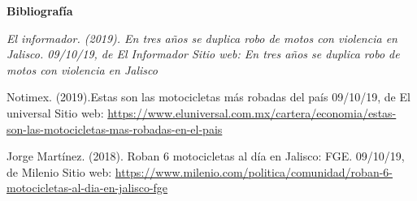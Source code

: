 \documentclass[12pt]{article}
\begin{document}


\vspace{\baselineskip}
\textbf{Bibliografía }\par

\textit{El informador. (2019). En tres años se duplica robo de motos con violencia en Jalisco. 09/10/19, de El Informador Sitio web: En tres años se duplica robo de motos con violencia en Jalisco}\par

Notimex. (2019).Estas son las motocicletas más robadas del país 09/10/19, de El universal Sitio web: \href{https://www.eluniversal.com.mx/cartera/economia/estas-son-las-motocicletas-mas-robadas-en-el-pais}{https://www.eluniversal.com.mx/cartera/economia/estas-son-las-motocicletas-mas-robadas-en-el-pais}\par

Jorge Martínez. (2018). Roban 6 motocicletas al día en Jalisco: FGE. 09/10/19, de Milenio Sitio web: \href{https://www.milenio.com/politica/comunidad/roban-6-motocicletas-al-dia-en-jalisco-fge}{https://www.milenio.com/politica/comunidad/roban-6-motocicletas-al-dia-en-jalisco-fge}\par


\vspace{\baselineskip}

\printbibliography
\end{document}
